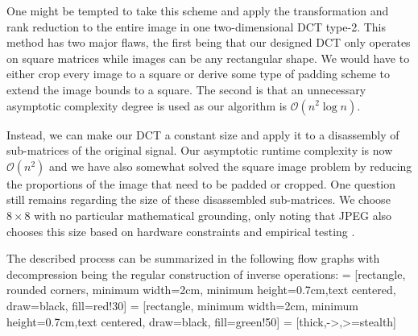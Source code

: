 \documentclass[12pt,technote]{IEEEtran}
\begin{document}
One might be tempted to take this scheme and apply the transformation and rank reduction to the entire image in one two-dimensional DCT type-2. This method has two major flaws, the first being that our designed DCT only operates on square matrices while images can be any rectangular shape. We would have to either crop every image to a square or derive some type of padding scheme to extend the image bounds to a square. The second is that an unnecessary asymptotic complexity degree is used as our algorithm is $\mathcal{O}(n^2\log{n})$.

Instead, we can make our DCT a constant size and apply it to a disassembly of sub-matrices of the original signal. Our asymptotic runtime complexity is now $\mathcal{O}(n^2)$ and we have also somewhat solved the square image problem by reducing the proportions of the image that need to be padded or cropped. One question still remains regarding the size of these disassembled sub-matrices. We choose $8\times 8$ with no particular mathematical grounding, only noting that JPEG also chooses this size based on hardware constraints and empirical testing \cite{JPEG1992}.

The described process can be summarized in the following flow graphs with decompression being the regular construction of inverse operations:
 = [rectangle, rounded corners, minimum width=2cm, minimum height=0.7cm,text centered, draw=black, fill=red!30]
 = [rectangle, minimum width=2cm, minimum height=0.7cm,text centered, draw=black, fill=green!50]
 = [thick,->,>=stealth]


\begin{center}
\end{center}
\end{document}
